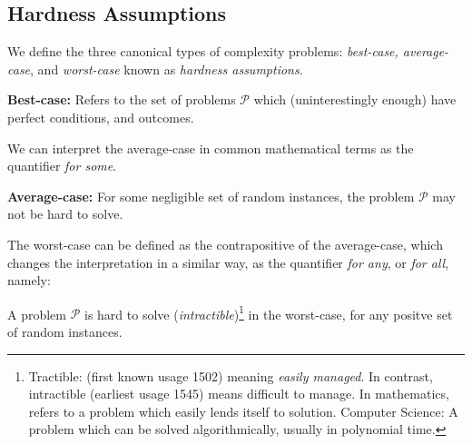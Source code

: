 \subsection{Hardness Assumptions}

We define the three canonical types of complexity problems: \emph{best-case, average-case}, and \emph{worst-case} known as \emph{hardness assumptions}. 

\begin{defn}
    \textbf{Best-case:} 
    Refers to the set of problems $\mathcal{P}$ which (uninterestingly enough) have perfect conditions, and outcomes.
\end{defn}


We can interpret the average-case in common mathematical terms as the quantifier \emph{for some}.

\begin{defn}
    \textbf{Average-case:} 
For some negligible set of random instances, the problem $\mathcal{P}$ may not be hard to solve. 
\end{defn}


The worst-case can be defined as the contrapositive of the average-case, which changes the interpretation in a similar way, as the quantifier \emph{for any}, or \emph{for all}, namely:

\begin{defn}
A problem $\mathcal{P}$ is hard to solve (\emph{intractible})\footnote{Tractible: (first known usage 1502) meaning \textit{easily managed}. In contrast, intractible (earliest usage 1545) means difficult to manage. In mathematics, refers to a problem which easily lends itself to solution. Computer Science: A problem which can be solved algorithmically, usually in polynomial time. } in the worst-case, for any positve set of random instances.
\end{defn}